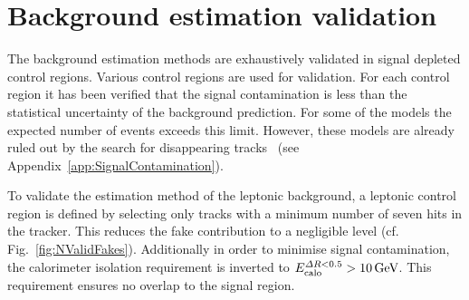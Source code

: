 \section{Background estimation validation}
\label{sec:BkgValidation}

The background estimation methods are exhaustively validated in signal depleted control regions.
Various control regions are used for validation.
For each control region it has been verified that the signal contamination is less than the statistical uncertainty of the background prediction.
For some of the models the expected number of events exceeds this limit. However, these models are already ruled out by the search for disappearing tracks~\cite{bib:CMS:DT_8TeV} (see Appendix~\ref{app:SignalContamination}).

To validate the estimation method of the leptonic background, a leptonic control region is defined by selecting only tracks with a minimum number of seven hits in the tracker.
This reduces the fake contribution to a negligible level (cf. Fig.~\ref{fig:NValidFakes}).
Additionally in order to minimise signal contamination, the calorimeter isolation requirement is inverted to $E^{\Delta R<0.5}_{\text{calo}}>10\,\text{Ge}\kern-0.06667em\text{V}$.
This requirement ensures no overlap to the signal region.


